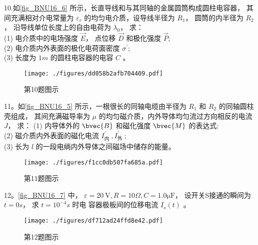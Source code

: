 10.如\autoref{fig_BNU16_6} 所示，长直导线和与其同轴的金属圆筒构成圆柱电容器， 其间充满相对介电常量为 $\varepsilon_{r}$ 的均匀电介质，设导线半径为 $R_{1}$， 圆筒的内半径为 $R_{2}$， 沿导线单位长度上的自由电荷为 $\lambda_{0}$， 求：\\
(1) 电介质中的电场强度 $\vec{E}$， 点位移 $\vec{D}$ 和极化强度 $\vec{P}$;\\
(2) 电介质内外表面的极化电荷面密度 $\sigma^{\prime}$;\\
(3) 长度为 $1 m$ 的圆柱电容器的电容 $C$ 。
\begin{figure}[ht]
\centering
\texttt{[image: ./figures/dd058b2afb704409.pdf]}
\caption{第10题图示} \label{fig_BNU16_6}
\end{figure}

11。如\autoref{fig_BNU16_5} 所示，一根很长的同轴电缆由半径为 $R_{1}$ 和 $R_{2}$ 的同轴圆柱壳组成， 其间充满磁导率为 $\mu$ 的均匀磁介质，内外导体均匀流过方向相反的电流 $J$， 求：
(1) 内导体外的 $\bvec{B}$ 和磁化强度 $\bvec{M}$ 的表达式;\\
(2) 磁介质内外表面的磁化电流 $I_{\text {内 }}^{\prime}, I_{\text {外 }}^{\prime}$;\\
(3) 长为 $l$ 的一段电绱内外导体之间磁场中储存的能量。
\begin{figure}[ht]
\centering
\texttt{[image: ./figures/f1cc0db507fa685a.pdf]}
\caption{第11题图示} \label{fig_BNU16_5}
\end{figure}
12。\autoref{fig_BNU16_7} 中， $\varepsilon=20 \mathrm{~V}, R=10 \Omega, C=1.0\mathrm{\mu F}$， 设开关S接通的瞬间为 $t=0 s$， 求 $t=10^{-4} s$ 时电 容器极板间的位移电流 $I_{s}(t)$ 。
\begin{figure}[ht]
\centering
\texttt{[image: ./figures/df712ad24ffd8e42.pdf]}
\caption{第12题图示} \label{fig_BNU16_7}
\end{figure}